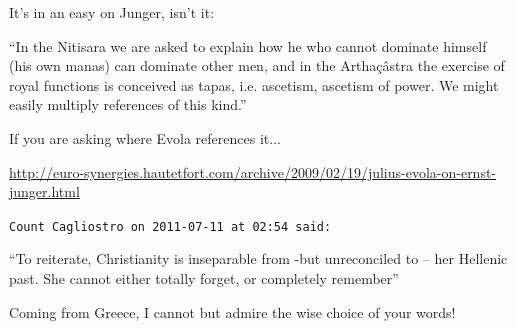 \begin{footnotesize}
\begin{sffamily}
It's in an easy on Junger, isn't it:

``In the Nitisara we are asked to explain how he who cannot dominate himself (his own manas) can dominate other men, and in the Arthaçâstra the exercise of royal functions is conceived as tapas, i.e. ascetism, ascetism of power. We might easily multiply references of this kind.''

If you are asking where Evola references it...

\url{http://euro-synergies.hautetfort.com/archive/2009/02/19/julius-evola-on-ernst-junger.html}


\hfill

\texttt{Count Cagliostro on 2011-07-11 at 02:54 said:}

``To reiterate, Christianity is inseparable from -but unreconciled to -- her Hellenic past. She cannot either totally forget, or completely remember''

Coming from Greece, I cannot but admire the wise choice of your words!


\hfill

\end{sffamily}
\end{footnotesize}

